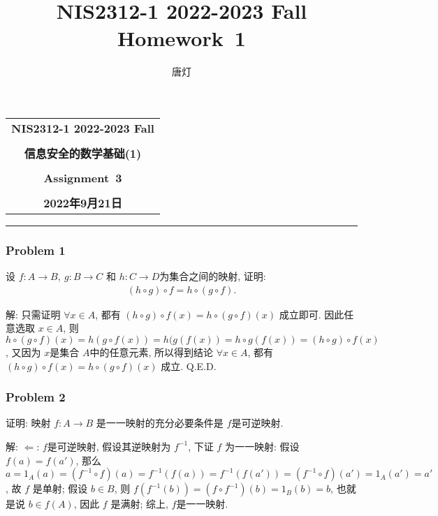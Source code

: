 \documentclass[a4paper,12pt]{ctexart}
\title{NIS2312-1 2022-2023 Fall Homework~1}
\author{唐灯}
\begin{document}
  \begin{center}

  \vspace{-0.3in}
  \begin{tabular}{c}
    \textbf{\Large NIS2312-1 2022-2023 Fall} \\
    \textbf{\Large  } \\
    \textbf{\Large  信息安全的数学基础(1)} \\
    \textbf{\Large  } \\
    \textbf{\Large  Assignment~3} \\
    \textbf{\Large  } \\
    \textbf{\Large 2022年9月21日} \\
  \end{tabular}
  \end{center}
  \noindent
  \rule{\linewidth}{0.4pt}
  
  
  \subsubsection*{Problem 1} 
      设 $ f: A\rightarrow B, ~g: B\rightarrow C $ 和 $ h: C\rightarrow D $为集合之间的映射, 证明: 
      \begin{align*}
          (h\circ g)\circ f=h\circ (g \circ f).
      \end{align*}

      解: 只需证明 $ \forall x\in A $, 都有 $ (h\circ g)\circ f(x)=h\circ (g \circ f)(x) $ 成立即可.
      因此任意选取 $ x\in A $, 则 $ h\circ(g\circ f)(x)=h(g\circ f(x))=h(g(f(x))=h\circ g(f(x))=(h\circ g)\circ f(x) $,
      又因为 $ x $是集合 $ A $中的任意元素, 所以得到结论
      $ \forall x\in A $, 都有 $ (h\circ g)\circ f(x)=h\circ (g \circ f)(x) $ 成立. Q.E.D.
\subsubsection*{Problem 2}
    证明: 映射 $ f: A\rightarrow B $ 是一一映射的充分必要条件是 $ f $是可逆映射.
      
    解: $ \Leftarrow $: $ f $是可逆映射, 假设其逆映射为 $ f^{-1} $, 下证 $ f $ 为一一映射:
    假设 $ f(a)=f(a') $, 
    那么 $ a=1_A(a)=(f^{-1}\circ f)(a)=f^{-1}(f(a))=f^{-1}(f(a'))=(f^{-1}\circ f)(a')=1_A(a')=a' $, 故 $ f $
    是单射; 假设 $ b\in B $, 则 $ f(f^{-1}(b))=(f\circ f^{-1})(b)=1_B(b)=b $, 也就是说 $ b\in f(A) $, 因此 $ f $
    是满射; 综上, $ f $是一一映射.
\end{document}
